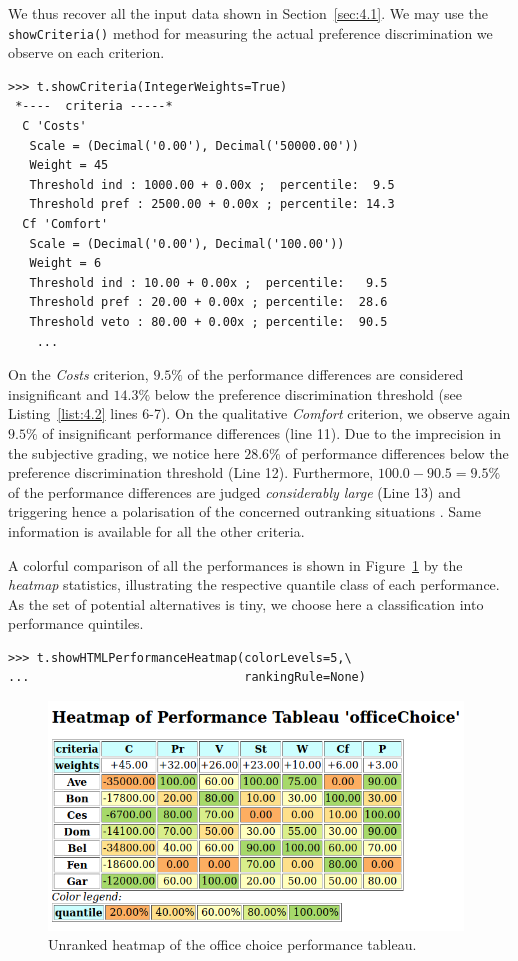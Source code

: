 We thus recover all the input data shown in Section~\ref{sec:4.1}. We may use the \texttt{showCriteria()} method for measuring the actual preference discrimination we observe on each criterion.
\begin{lstlisting}[caption={Inspecting the performance criteria.},label=list:4.2]
>>> t.showCriteria(IntegerWeights=True)
 *----  criteria -----*
  C 'Costs'
   Scale = (Decimal('0.00'), Decimal('50000.00'))
   Weight = 45
   Threshold ind : 1000.00 + 0.00x ;  percentile:  9.5
   Threshold pref : 2500.00 + 0.00x ; percentile: 14.3
  Cf 'Comfort'
   Scale = (Decimal('0.00'), Decimal('100.00'))
   Weight = 6
   Threshold ind : 10.00 + 0.00x ;  percentile:   9.5
   Threshold pref : 20.00 + 0.00x ; percentile:  28.6
   Threshold veto : 80.00 + 0.00x ; percentile:  90.5
    ...
\end{lstlisting}
On the \emph{Costs} criterion, $9.5\%$ of the performance differences are considered insignificant and $14.3\%$ below the preference discrimination threshold (see Listing~\ref{list:4.2} lines 6-7). On the qualitative \emph{Comfort} criterion, we observe again $9.5\%$ of insignificant performance differences (line 11). Due to the imprecision in the subjective grading, we notice here $28.6\%$ of performance differences below the preference discrimination threshold (Line 12). Furthermore, $100.0 - 90.5 = 9.5\%$ of the performance differences are judged \emph{considerably large} (Line 13) and triggering hence a polarisation of the concerned outranking situations \citep{BIS-2013}. Same information is available for all the other criteria. 
 
A colorful comparison of all the performances is shown in Figure~\ref{fig:4.1} by the \emph{heatmap} statistics, illustrating the respective quantile class of each performance. As the set of potential alternatives is tiny, we choose here a classification into performance quintiles.
\begin{lstlisting}
>>> t.showHTMLPerformanceHeatmap(colorLevels=5,\
...                              rankingRule=None)
\end{lstlisting}
    \begin{figure}[h]
\includegraphics[width=11cm]{Figures/officeChoiceHeatmap.png}
\caption{Unranked heatmap of the office choice performance tableau.}
\label{fig:4.1}       %
\end{figure}

